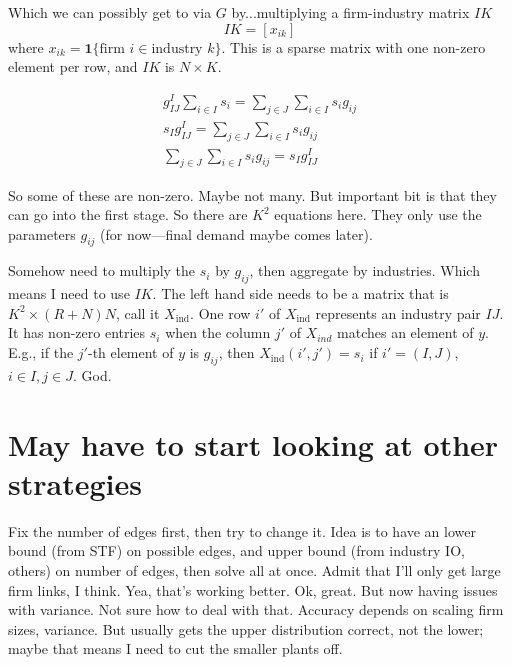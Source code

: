 \documentclass[11pt]{article}
\begin{document}
Which we can possibly get to via $G$ by...multiplying a firm-industry matrix $IK$
\[
IK = [x_{ik} ]
\]
where $x_{ik} = \mathbf{1} \{ \text{firm } i \in \text{industry } k \}$. This is a sparse matrix with one non-zero element per row, and $IK$ is $N \times K$. 

\begin{gather}
g^I_{IJ} \sum_{i\in I} s_i = \sum_{j \in J} \sum_{i \in I} s_i g_{ij} \\
s_I g^I_{IJ} = \sum_{j \in J} \sum_{i \in I} s_i g_{ij} \\
\sum_{j \in J} \sum_{i \in I} s_i g_{ij} = s_I g^I_{IJ}
\end{gather}
 
 So some of these are non-zero. Maybe not many. But important bit is that they can go into the first stage. So there are $K^2$ equations here. They only use the parameters $g_{ij}$ (for now---final demand maybe comes later).
 
 Somehow need to multiply the $s_i$ by $g_{ij}$, then aggregate by industries. Which means I need to use $IK$. The left hand side needs to be a matrix that is $K^2 \times (R+N)N$, call it $X_{\text{ind}}$. One row $i'$ of $X_{\text{ind}}$ represents an industry pair $IJ$. It has non-zero entries $s_i$ when the column $j'$ of $X_{ind}$ matches an element of $y$. E.g., if the $j'$-th element of $y$ is $g_{ij}$, then $X_{\text{ind}}(i',j') = s_i$ if $i'=(I,J)$, $i \in I, j \in J$. God.

\section{May have to start looking at other strategies}
Fix the number of edges first, then try to change it. Idea is to have an lower bound (from STF) on possible edges, and upper bound (from industry IO, others) on number of edges, then solve all at once. Admit that I'll only get large firm links, I think. Yea, that's working better. Ok, great. But now having issues with variance. Not sure how to deal with that. Accuracy depends on scaling firm sizes, variance. But usually gets the upper distribution correct, not the lower; maybe that means I need to cut the smaller plants off.



\end{document}
